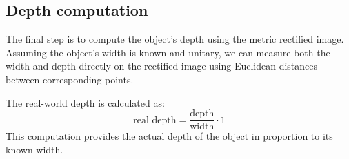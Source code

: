 \subsection{Depth computation}
The final step is to compute the object's depth using the metric rectified image. 
Assuming the object's width is known and unitary, we can measure both the width and depth directly on the rectified image using Euclidean distances between corresponding points.

The real-world depth is calculated as:
\[\text{real depth}=\dfrac{\text{depth}}{\text{width}} \cdot 1\]
This computation provides the actual depth of the object in proportion to its known width.